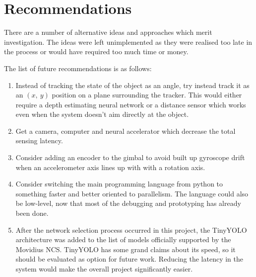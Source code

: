 \chapter{Recommendations}

There are a number of alternative ideas and approaches which merit investigation. The ideas were left unimplemented as they were realised too late in the process or would have required too much time or money.

The list of future recommendations is as follows:

\begin{enumerate}
	\item Instead of tracking the state of the object as an angle, try instead track it as an $(x,~y)$ position on a plane surrounding the tracker. This would either require a depth estimating neural network or a distance sensor which works even when the system doesn't aim directly at the object.
	\item Get a camera, computer and neural accelerator which decrease the total sensing latency.
	\item Consider adding an encoder to the gimbal to avoid built up gyroscope drift when an accelerometer axis lines up with with a rotation axis.
	\item Consider switching the main programming language from python to something faster and better oriented to parallelism. The language could also be low-level, now that most of the debugging and prototyping has already been done.
	\item After the network selection process occurred in this project, the TinyYOLO architecture was added to the list of models officially supported by the Movidius NCS. TinyYOLO has some grand claims about its speed, so it should be evaluated as option for future work. Reducing the latency in the system would make the overall project significantly easier.
\end{enumerate}

